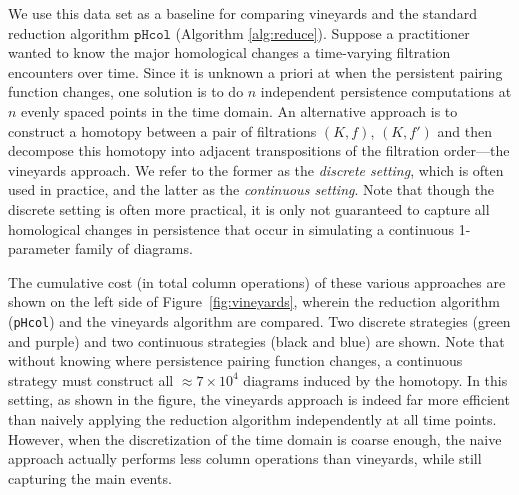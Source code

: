\documentclass[sn-mathphys]{sn-jnl}
\begin{document}
  We use this data set as a baseline for comparing vineyards and the standard reduction algorithm $\texttt{pHcol}$ (Algorithm \ref{alg:reduce}). Suppose a practitioner wanted to know the major homological changes a time-varying filtration encounters over time.
  Since it is unknown a priori at when the persistent pairing function changes, one solution is to do $n$ independent persistence computations at $n$ evenly spaced points in the time domain.  An alternative approach is to construct a homotopy between a pair of filtrations $(K, f)$, $(K,f')$ and then decompose this homotopy into adjacent transpositions of the filtration order---the vineyards approach. 
 We refer to the former as the \emph{discrete setting}, which is often used in practice, and the  latter as the \emph{continuous setting}. Note that though the discrete setting is often more practical, it is only not guaranteed to capture all homological changes in persistence that occur in simulating a continuous 1-parameter family of diagrams.  
 
 The cumulative cost (in total column operations) of these various approaches are shown on the left side of Figure~\ref{fig:vineyards}, wherein the reduction algorithm (\texttt{pHcol}) and the vineyards algorithm are compared. Two discrete strategies (green and purple) and two continuous strategies (black and blue) are shown.
  Note that without knowing where persistence pairing function changes, a continuous strategy must construct all $\approx 7 \times 10^{4}$ diagrams induced by the homotopy. 
  In this setting, as shown in the figure, the vineyards approach is indeed far more efficient than naively applying the reduction algorithm independently at all time points.
  However, when the discretization of the time domain is coarse enough, the naive approach actually performs less column operations than vineyards, while still capturing the main events. 
  
\end{document}
